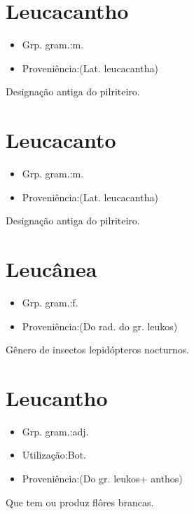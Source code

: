\section{Leucacantho}
\begin{itemize}
\item {Grp. gram.:m.}
\end{itemize}
\begin{itemize}
\item {Proveniência:(Lat. \textunderscore leucacantha\textunderscore )}
\end{itemize}
Designação antiga do pilriteiro.
\section{Leucacanto}
\begin{itemize}
\item {Grp. gram.:m.}
\end{itemize}
\begin{itemize}
\item {Proveniência:(Lat. \textunderscore leucacantha\textunderscore )}
\end{itemize}
Designação antiga do pilriteiro.
\section{Leucânea}
\begin{itemize}
\item {Grp. gram.:f.}
\end{itemize}
\begin{itemize}
\item {Proveniência:(Do rad. do gr. \textunderscore leukos\textunderscore )}
\end{itemize}
Gênero de insectos lepidópteros nocturnos.
\section{Leucantho}
\begin{itemize}
\item {Grp. gram.:adj.}
\end{itemize}
\begin{itemize}
\item {Utilização:Bot.}
\end{itemize}
\begin{itemize}
\item {Proveniência:(Do gr. \textunderscore leukos\textunderscore  + \textunderscore anthos\textunderscore )}
\end{itemize}
Que tem ou produz flôres brancas.
